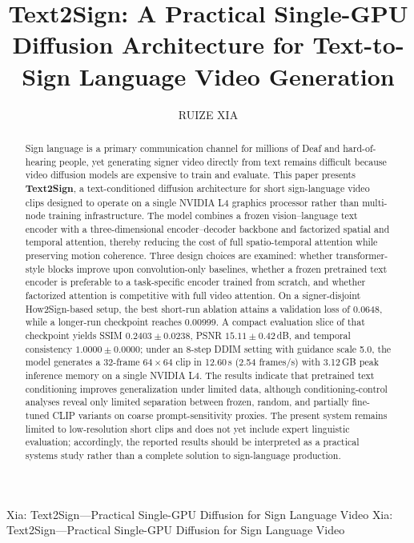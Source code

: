 \documentclass{ieeeaccess}
\begin{document}

\title{Text2Sign: A Practical Single-GPU Diffusion Architecture for Text-to-Sign Language Video Generation}
\author{
\uppercase{Ruize Xia}
\address[]{Independent Researcher (e-mail: xiaruize0911@gmail.com)}
}


\markboth
{Xia: Text2Sign---Practical Single-GPU Diffusion for Sign Language Video}
{Xia: Text2Sign---Practical Single-GPU Diffusion for Sign Language Video}

\begin{abstract}
    
Sign language is a primary communication channel for millions of Deaf and hard-of-hearing people, yet generating signer video directly from text remains difficult because video diffusion models are expensive to train and evaluate. This paper presents \textbf{Text2Sign}, a text-conditioned diffusion architecture for short sign-language video clips designed to operate on a single NVIDIA L4 graphics processor rather than multi-node training infrastructure. The model combines a frozen vision--language text encoder with a three-dimensional encoder--decoder backbone and factorized spatial and temporal attention, thereby reducing the cost of full spatio-temporal attention while preserving motion coherence. Three design choices are examined: whether transformer-style blocks improve upon convolution-only baselines, whether a frozen pretrained text encoder is preferable to a task-specific encoder trained from scratch, and whether factorized attention is competitive with full video attention. On a signer-disjoint How2Sign-based setup, the best short-run ablation attains a validation loss of 0.0648, while a longer-run checkpoint reaches 0.00999. A compact evaluation slice of that checkpoint yields SSIM $0.2403\pm0.0238$, PSNR $15.11\pm0.42$\,dB, and temporal consistency $1.0000\pm0.0000$; under an 8-step DDIM setting with guidance scale 5.0, the model generates a 32-frame $64\times64$ clip in 12.60\,s (2.54 frames/s) with 3.12\,GB peak inference memory on a single NVIDIA L4. The results indicate that pretrained text conditioning improves generalization under limited data, although conditioning-control analyses reveal only limited separation between frozen, random, and partially fine-tuned CLIP variants on coarse prompt-sensitivity proxies. The present system remains limited to low-resolution short clips and does not yet include expert linguistic evaluation; accordingly, the reported results should be interpreted as a practical systems study rather than a complete solution to sign-language production.
\end{abstract}
\end{document}
